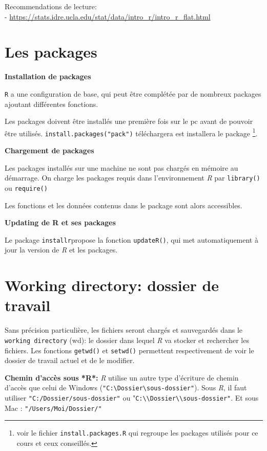 \documentclass[]{book}
\let\rmarkdownfootnote\footnote%
\def\footnote{\protect\rmarkdownfootnote}
\begin{document}
Recommendations de lecture:\\
- \url{https://stats.idre.ucla.edu/stat/data/intro_r/intro_r_flat.html}

\hypertarget{les-packages-1}{%
\section{Les packages}\label{les-packages-1}}

\textbf{Installation de packages}

\texttt{R} a une configuration de base, qui peut être complétée par de nombreux packages ajoutant différentes fonctions.

Les packages doivent être installés une première fois sur le pc avant de pouvoir être utilisés. \texttt{install.packages("pack")} téléchargera est installera le package \footnote{voir le fichier \texttt{install.packages.R} qui regroupe les packages utilisés pour ce cours et ceux conseillés.}.

\textbf{Chargement de packages}

Les packages installés sur une machine ne sont pas chargés en mémoire au démarrage. On charge les packages requis dans l'environnement \emph{R} par \texttt{library()} ou \texttt{require()}

Les fonctions et les données contenus dans le package sont alors accessibles.

\textbf{Updating de R et ses packages}

Le package \texttt{installr}propose la fonction \texttt{updateR()}, qui met automatiquement à jour la version de \emph{R} et les packages.

\hypertarget{working-directory-dossier-de-travail-1}{%
\section{Working directory: dossier de travail}\label{working-directory-dossier-de-travail-1}}

Sans précision particulière, les fichiers seront chargés et sauvegardés dans le \texttt{working\ directory} (wd): le dossier dans lequel \emph{R} va stocker et rechercher les fichiers. Les fonctions \texttt{getwd()} et \texttt{setwd()} permettent respectivement de voir le dossier de travail actuel et de le modifier.

\textbf{Chemin d'accès sous *R*:}
\emph{R} utilise un autre type d'écriture de chemin d'accès que celui de Windows (\texttt{"C:\textbackslash{}Dossier\textbackslash{}sous-dossier"}). Sous \emph{R}, il faut utiliser \texttt{"C:/Dossier/sous-dossier"} ou "\texttt{C:\textbackslash{}\textbackslash{}Dossier\textbackslash{}\textbackslash{}sous-dossier"}. Et sous Mac : \texttt{"/Users/Moi/Dossier/"}
\end{document}
